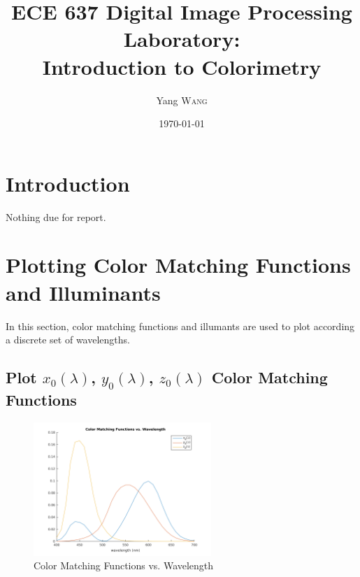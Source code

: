 \documentclass{article}
\title{ECE 637 Digital Image Processing Laboratory: \\ Introduction to
Colorimetry} %
\author{Yang \textsc{Wang}} %
\date{\today} %
\begin{document}
\maketitle %


\section{Introduction}
	Nothing due for report.

\section{Plotting Color Matching Functions and Illuminants}
	In this section, color matching functions and illumants are used to plot
	according a discrete set of wavelengths.

\subsection{Plot $x_{0}(\lambda)$, $y_{0}(\lambda)$, $z_{0}(\lambda)$ Color
			Matching Functions}
	\begin{figure}[h]
		\begin{center}
			\includegraphics[width=0.6\textwidth]{xyzmatching.png}
			\caption{Color Matching Functions vs. Wavelength}
		\end{center}
	\end{figure}

\pagebreak
\end{document}
